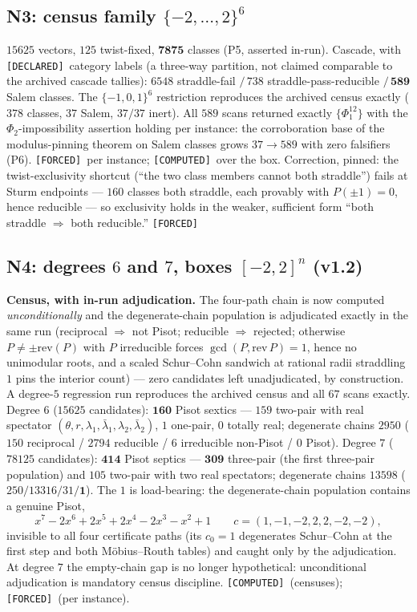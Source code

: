 \documentclass[11pt]{article}
\newcommand{\F}{\textnormal{\texttt{[FORCED]}}}
\newcommand{\C}{\textnormal{\texttt{[COMPUTED]}}}
\newcommand{\Dc}{\textnormal{\texttt{[DECLARED]}}}
\theoremstyle{definition}
\begin{document}
\subsection{N3: census family $\{-2,\dots,2\}^6$}
$15625$ vectors, $125$ twist-fixed, $\mathbf{7875}$ classes (P5, asserted
in-run). Cascade, with \Dc\ category labels (a three-way partition, not
claimed comparable to the archived cascade tallies): $6548$ straddle-fail
$/\,738$ straddle-pass-reducible $/\,\mathbf{589}$ Salem classes. The
$\{-1,0,1\}^6$ restriction reproduces the archived census exactly ($378$
classes, $37$ Salem, $37/37$ inert). All $589$ scans returned exactly
$\{\Phi_1^{12}\}$ with the $\Phi_2$-impossibility assertion holding per
instance: the corroboration base of the modulus-pinning theorem on Salem
classes grows $37\to589$ with zero falsifiers (P6). \F\ per instance; \C\
over the box. Correction, pinned: the twist-exclusivity shortcut (``the two
class members cannot both straddle'') fails at Sturm endpoints --- $160$
classes both straddle, each provably with $P(\pm1)=0$, hence reducible ---
so exclusivity holds in the weaker, sufficient form ``both straddle
$\Rightarrow$ both reducible.'' \F

\subsection{N4: degrees $6$ and $7$, boxes $[-2,2]^n$ (v1.2)}
\label{sec:n4}

\textbf{Census, with in-run adjudication.} The four-path chain is now
computed \emph{unconditionally} and the degenerate-chain population is
adjudicated exactly in the same run (reciprocal $\Rightarrow$ not Pisot;
reducible $\Rightarrow$ rejected; otherwise $P\neq\pm\mathrm{rev}(P)$ with
$P$ irreducible forces $\gcd(P,\mathrm{rev}\,P)=1$, hence no unimodular
roots, and a scaled Schur--Cohn sandwich at rational radii straddling $1$
pins the interior count) --- zero candidates left unadjudicated, by
construction. A degree-$5$ regression run reproduces the archived census
and all $67$ scans exactly. Degree $6$ ($15625$ candidates): $\mathbf{160}$
Pisot sextics --- $159$ two-pair with real spectator
$(\theta,r,\lambda_1,\bar\lambda_1,\lambda_2,\bar\lambda_2)$, $1$ one-pair,
$0$ totally real; degenerate chains $2950$ ($150$ reciprocal / $2794$
reducible / $6$ irreducible non-Pisot / $0$ Pisot). Degree $7$ ($78125$
candidates): $\mathbf{414}$ Pisot septics --- $\mathbf{309}$ three-pair
(the first three-pair population) and $105$ two-pair with two real
spectators; degenerate chains $13598$ ($250/13316/31/\mathbf{1}$). The
$1$ is load-bearing: the degenerate-chain population contains a genuine
Pisot,
\[
x^7-2x^6+2x^5+2x^4-2x^3-x^2+1\qquad c=(1,-1,-2,2,2,-2,-2),
\]
invisible to all four certificate paths (its $c_0=1$ degenerates
Schur--Cohn at the first step and both M\"obius--Routh tables) and caught
only by the adjudication. At degree $7$ the empty-chain gap is no longer
hypothetical: unconditional adjudication is mandatory census discipline.
\C\ (censuses); \F\ (per instance).
\end{document}
